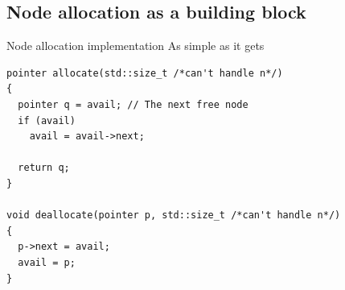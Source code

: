 \documentclass[10pt,aspectratio=169]{beamer}
\begin{document}
\subsection{Node allocation as a building block}

\begin{frame}[fragile]{Node allocation implementation}
{As simple as it gets}

\begin{lstlisting}
pointer allocate(std::size_t /*can't handle n*/)
{
  pointer q = avail; // The next free node
  if (avail)
    avail = avail->next;

  return q;
}

void deallocate(pointer p, std::size_t /*can't handle n*/)
{
  p->next = avail;
  avail = p;
}

\end{lstlisting}
\end{frame}
\end{document}
